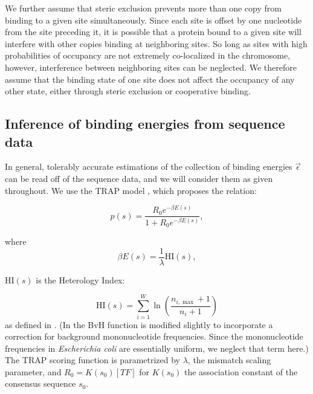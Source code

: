 \documentclass{article}
\begin{document}

We further assume that steric exclusion prevents more than one copy
from binding to a given site simultaneously.  Since each site is
offset by one nucleotide from the site preceding it, it is possible
that a protein bound to a given site will interfere with other copies
binding at neighboring sites.  So long as sites with high
probabilities of occupancy are not extremely co-localized in the
chromosome, however, interference between neighboring sites can be
neglected.  We therefore assume that the binding state of one site
does not affect the occupancy of any other state, either through
steric exclusion or cooperative binding.


\subsection{Inference of binding energies from sequence data}
In general, tolerably accurate estimations of the collection of
binding energies $\vec{\epsilon}$ can be read off of the sequence
data, and we will consider them as given throughout.  We use the TRAP
model \cite{roider07}, which proposes the relation:

\begin{equation}
  \label{eq:trap_init}
  p(s) = \frac{R_0e^{-\beta E(s)}}{1 + R_0e^{-\beta E(s)}},
\end{equation}

where
\begin{equation}
  \label{eq:trap}
  \beta E(s) = \frac{1}{\lambda} \mathrm{HI}(s),
\end{equation}

 $\mathrm{HI}(s)$ is the Heterology Index:

\begin{equation}
  \label{eq:bvh}
  \mathrm{HI}(s) = \displaystyle\sum_{i=1}^W\ln(\frac{n_{i,\max}+1}{n_{i}+1})
\end{equation}
as defined in \cite{berg87}.  (In \cite{roider07} the BvH
function is modified slightly to incorporate a correction for
background mononucleotide frequencies.  Since the mononucleotide
frequencies in \textit{Escherichia coli} are essentially uniform, we
neglect that term here.)  The TRAP scoring function is parametrized by
$\lambda$, the mismatch scaling parameter, and $R_0 = K(s_0)[TF]$ for
$K(s_0)$ the association constant of the consensus sequence $s_0$.
\end{document}
